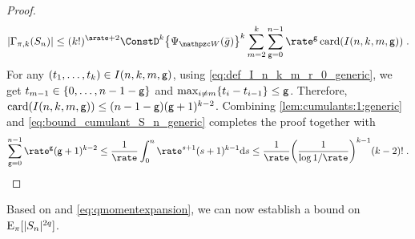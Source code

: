 \begin{proof}
\begin{equation}
\label{lem:cumulants:1:generic}
 |\Gamma_{\pi,k}(S_n)|
\le (k!)^{\arate + 2} \ConstD^k \bigl\{\normlike_{\lyapW}(\bar{g})\bigr\}^{k} \sum_{m=2}^{k}\sum_{\gapindex=0}^{n-1} \rate^{\gapindex} \card{I(n,k,m,\gapindex)} \eqsp.
\end{equation}
For any $(t_1,\ldots,t_k) \in I(n,k,m,\mathsf{g})$, using \eqref{eq:def_I_n_k_m_r_0_generic}, we get $t_{m-1} \in \{0,\dots,n-1-\mathsf{g}\}$ and $\max_{i\neq m}\{t_{i}-t_{i-1}\} \leq \mathsf{g}$.
Therefore, $\operatorname{card}(I(n,k,m,\mathsf{g})) \leq (n-1-\mathsf{g})(\mathsf{g}+1)^{k-2}$. Combining \eqref{lem:cumulants:1:generic} and \eqref{eq:bound_cumulant_S_n_generic} completes the proof together with
\begin{align*}
\sum_{\gapindex=0}^{n-1} \rate^{\gapindex} (\gapindex+1)^{k-2} \leq \frac{1}{\rate} \int_{0}^n \rate^{s+1}(s+1)^{k-1} \rmd s  \leq \frac{1}{\rate}\biggl(\frac{1}{\log{1/\rate}}\biggr)^{k-1}(k-2)!\eqsp.
\end{align*}
\end{proof}


Based on  and \eqref{eq:qmomentexpansion}, we can now establish a bound on $\mathrm{E}_{\pi}[|S_n|^{2q}]$.

